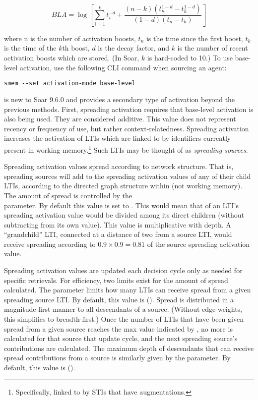 $$BLA = \log \left[ \sum\limits_{i=1}^{k} t_i^{-d} + \dfrac{(n-k)(t_n^{1-d} - t_k^{1-d})}{(1-d)(t_n-t_k)} \right]$$

where n is the number of activation boosts, $t_n$ is the time since the first boost, $t_k$ is the time of the $k$th boost, $d$ is the decay factor, and $k$ is the number of recent activation boosts which are stored. (In Soar, $k$ is hard-coded to 10.) To use base-level activation, use the following CLI command when sourcing an agent:

\begin{verbatim}
smem --set activation-mode base-level
\end{verbatim}

 is new to Soar 9.6.0 and provides a secondary type of activation beyond the previous methods. First, spreading activation requires that base-level activation is also being used. They are considered additive. This value does not represent recency or frequency of use, but rather context-relatedness. Spreading activation increases the activation of LTIs which are linked to by identifiers currently present in working memory.\footnote{
	Specifically, linked to by STIs that have augmentations.}
Such LTIs may be thought of as \textit{spreading sources}.

Spreading activation values spread according to network structure. That is, spreading sources will add to the spreading activation values of any of their child LTIs, according to the directed graph structure within  (not working memory).
The amount of spread is controlled by the \\
 parameter. By default this value is set to . This would mean that  of an LTI's spreading activation value would be divided among its direct children (without subtracting from its own value). This value is multiplicative with depth. A ``grandchild'' LTI, connected at a distance of two from a source LTI, would receive spreading according to $0.9\times 0.9 = 0.81$ of the source spreading activation value.

Spreading activation values are updated each decision cycle only as needed for specific  retrievals. For efficiency, two limits exist for the amount of spread calculated. The  parameter limits how many LTIs can receive spread from a given spreading source LTI. By default, this value is (). Spread is distributed in a magnitude-first manner to all descendants of a source. (Without edge-weights, this simplifies to breadth-first.) Once the number of LTIs that have been given spread from a given source reaches the max value indicated by , no more is calculated for that source that update cycle, and the next spreading source's contributions are calculated. The maximum depth of descendants that can receive spread contributions from a source is similarly given by the  parameter. By default, this value is ().

